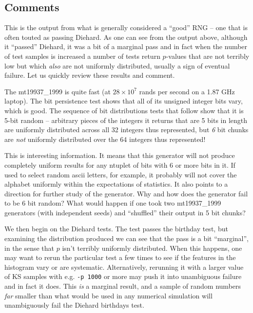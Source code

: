 \documentclass[12pt]{book}
\begin{document}
\subsection{Comments}

This is the output from what is generally considered a ``good'' RNG --
one that is often touted as passing Diehard.  As one can see from the
output above, although it ``passed'' Diehard, it was a bit of a marginal
pass and in fact when the number of test samples is increased a number
of tests return $p$-values that are not terribly low but which {\em
also} are not uniformly distributed, usually a sign of eventual failure.
Let us quickly review these results and comment.

The mt19937\_1999 is quite fast (at $28\times10^7$ rands per second on a
1.87 GHz laptop).  The bit persistence test shows that all of its
unsigned integer bits vary, which is good.  The sequence of bit
distributions tests that follow show that it is 5-bit random --
arbitrary pieces of the integers it returns that are 5 bits in length
are uniformly distributed across all 32 integers thus represented, but
{\em 6} bit chunks are {\em not} uniformly distributed over the 64
integers thus represented!  

This is interesting information.  It means that this generator will not
produce completely uniform results for any ntuplet of bits with 6 or
more bits in it.  If used to select random ascii letters, for example,
it probably will not cover the alphabet uniformly within the
expectations of statistics.  It also points to a direction for further
study of the generator.  Why and how does the generator fail to be 6 bit
random?  What would happen if one took two mt19937\_1999 generators
(with independent seeds) and ``shuffled'' their output in 5 bit chunks?

We then begin on the Diehard tests.  The test passes the birthday test,
but examining the distribution produced we can see that the pass is a
bit ``marginal'', in the sense that $p$ isn't terribly uniformly
distributed.  When this happens, one may want to rerun the particular
test a few times to see if the features in the histogram vary or are
systematic.  Alternatively, rerunning it with a larger value of KS
samples with e.g. {\tt -p 1000} or more may push it into unambiguous
failure and in fact it does.  This {\em is} a marginal result, and a
sample of random numbers {\em far} smaller than what would be used in
any numerical simulation will unambiguously fail the Diehard birthdays
test.
\end{document}

